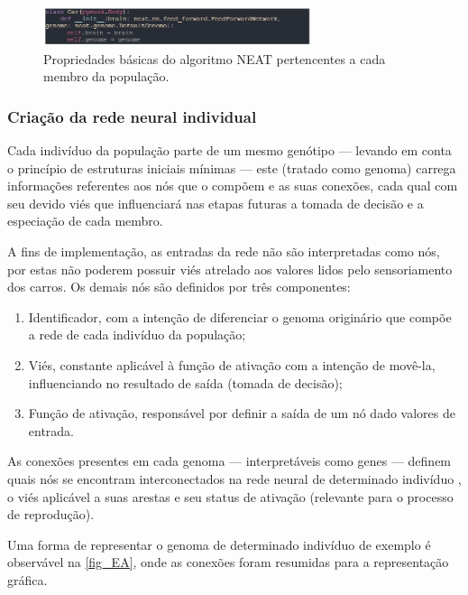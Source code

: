 \begin{figure}[htb]
        \centering
        \caption{\label{fig_DA}Propriedades básicas do algoritmo NEAT pertencentes a cada membro da população.}
        \includegraphics[width=0.7\textwidth]{images/DA.png}
\end{figure}

\subsubsection{Criação da rede neural individual}
Cada indivíduo da população parte de um mesmo genótipo — levando em conta o princípio de estruturas iniciais mínimas —
este (tratado como genoma) carrega informações referentes aos nós que o compõem e as suas conexões,
cada qual com seu devido viés que influenciará nas etapas futuras a tomada de decisão e a especiação de cada membro.

A fins de implementação, as entradas da rede não são interpretadas como nós, por estas não poderem possuir
viés atrelado aos valores lidos pelo sensoriamento dos carros. Os demais nós são definidos por três componentes: 

\begin{enumerate}
	\item Identificador, com a intenção de diferenciar o genoma originário que compõe a rede de cada indivíduo da população;
	\item Viés, constante aplicável à função de ativação com a intenção de movê-la, influenciando no resultado de saída (tomada de decisão);
	\item Função de ativação, responsável por definir a saída de um nó dado valores de entrada.
\end{enumerate}

As conexões presentes em cada genoma — interpretáveis como genes — definem quais nós se encontram interconectados na rede neural de determinado indivíduo
, o viés aplicável a suas arestas e seu status de ativação (relevante para o processo de reprodução).

Uma forma de representar o genoma de determinado indivíduo de exemplo é observável na \autoref{fig_EA}, onde as conexões foram resumidas para a representação gráfica.

